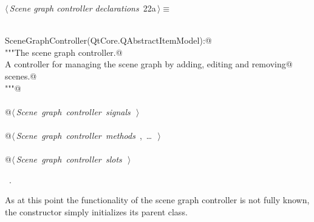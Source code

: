 \documentclass[
    a4paper,      %
    10pt,         %
    openright,    %
    notitlepage,  %
    parskip=half, %
]{scrreprt}       %
\theoremstyle{definition}                    %
\begin{document}
\begin{flushleft} \small
\begin{minipage}{\linewidth}\label{scrap14}\raggedright\small
{} $\langle\,${\itshape Scene graph controller declarations}\nobreak\ {\footnotesize {22a}}$\,\rangle\equiv$
\vspace{-1ex}
\begin{list}{}{} \item
\mbox{}\lstinline@@\\
\mbox{}\lstinline@class SceneGraphController(QtCore.QAbstractItemModel):@\\
\mbox{}\lstinline@    """The scene graph controller.@\\
\mbox{}\lstinline@    A controller for managing the scene graph by adding, editing and removing@\\
\mbox{}\lstinline@    scenes.@\\
\mbox{}\lstinline@    """@\\
\mbox{}\lstinline@@\\
\mbox{}\lstinline@    @\hbox{$\langle\,${\itshape Scene graph controller signals}\nobreak\ {\footnotesize {}}$\,\rangle$}\lstinline@@\\
\mbox{}\lstinline@@\\
\mbox{}\lstinline@    @\hbox{$\langle\,${\itshape Scene graph controller methods}\nobreak\ {\footnotesize {}, \ldots\ }$\,\rangle$}\lstinline@@\\
\mbox{}\lstinline@@\\
\mbox{}\lstinline@    @\hbox{$\langle\,${\itshape Scene graph controller slots}\nobreak\ {\footnotesize {}}$\,\rangle$}\lstinline@@\\
\mbox{}\lstinline@@{\NWsep}
\end{list}
\vspace{-1.5ex}
\footnotesize
\begin{list}{}{\setlength{\itemsep}{-\parsep}\setlength{\itemindent}{-\leftmargin}}
\item \NWtxtMacroRefIn\ .

\item{}
\end{list}
\end{minipage}\vspace{4ex}
\end{flushleft}
As at this point the functionality of the scene graph controller is not fully
known, the constructor simply initializes its parent class.
\end{document}
